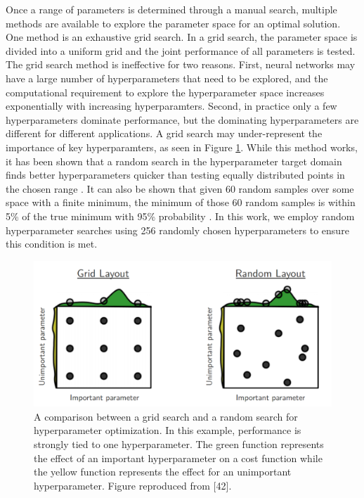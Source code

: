 Once a range of parameters is determined through a manual search, multiple methods are available to explore the parameter space for an optimal solution. One method is an exhaustive grid search. In a grid search, the parameter space is divided into a uniform grid and the joint performance of all parameters is tested. The grid search method is ineffective for two reasons. First, neural networks may have a large number of hyperparameters that need to be explored, and the computational requirement to explore the hyperparameter space increases exponentially with increasing hyperparamters. Second, in practice only a few hyperparameters dominate performance, but the dominating hyperparameters are different for different applications. A grid search may under-represent the importance of key hyperparamters, as seen in Figure \ref{fig:Bergstra12a_hyperparameter_grid_vs_random}.  While this method works, it has been shown that a random search in the hyperparameter target domain finds better hyperparameters quicker than testing equally distributed points in the chosen range \cite{Bergstra2012}. It can also be shown that given 60 random samples over some space with a finite minimum, the minimum of those 60 random samples is within 5\% of the true minimum with 95\% probability \cite{Zheng2015}. In this work, we employ random hyperparameter searches using 256 randomly chosen hyperparameters to ensure this condition is met.

\begin{figure}[H]
	\centering
	\includegraphics[width=0.99\linewidth]{images/Bergstra12a_hyperparameter_grid_vs_random}
	\caption{A comparison between a grid search and a random search for hyperparameter optimization. In this example, performance is strongly tied to one hyperparameter. The green function represents the effect of an important hyperparameter on a cost function while the yellow function represents the effect for an unimportant hyperparameter. Figure reproduced from [42].}
	\label{fig:Bergstra12a_hyperparameter_grid_vs_random}
\end{figure}



